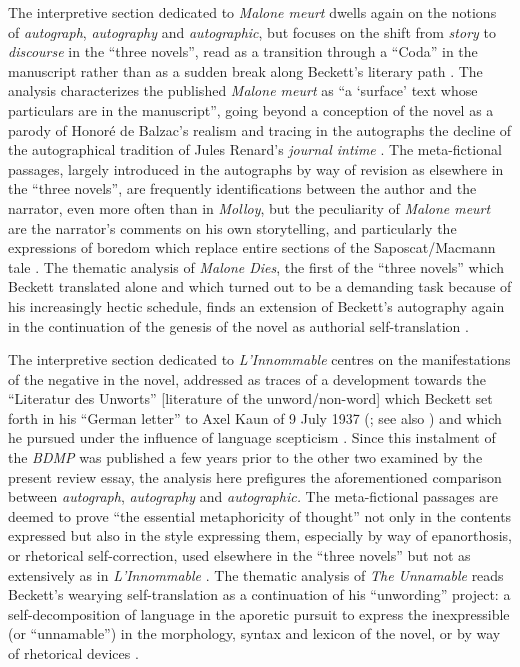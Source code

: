 \begin{paper}
The interpretive section dedicated to \emph{Malone meurt} dwells again
on the notions of \emph{autograph}, \emph{autography} and
\emph{autographic}, but focuses on the shift from \emph{story} to
\emph{discourse} in the ``three novels'', read as a transition through a
``Coda'' in the manuscript rather than as a sudden break along Beckett's
literary path \citep[23--24]{van_hulle_making_2017}. The analysis
characterizes the published \emph{Malone meurt} as ``a `surface' text
whose particulars are in the manuscript'', going beyond a conception of
the novel as a parody of Honoré de Balzac's realism and tracing in the
autographs the decline of the autographical tradition of Jules Renard's
\emph{journal intime} \citep[27--29 and 158]{van_hulle_making_2017}. The
meta-fictional passages, largely introduced in the autographs by way of
revision as elsewhere in the ``three novels'', are frequently
identifications between the author and the narrator, even more often than in
\emph{Molloy}, but the peculiarity of \emph{Malone meurt} are the
narrator's comments on his own storytelling, and particularly the
expressions of boredom which replace entire sections of the
Saposcat/Macmann tale \citep[123 and \emph{passim}]{van_hulle_making_2017}. The thematic analysis of \emph{Malone Dies}, the first
of the ``three novels'' which Beckett translated alone and which turned
out to be a demanding task because of his increasingly hectic schedule,
finds an extension of Beckett's autography again in the continuation of
the genesis of the novel as authorial self-translation \citep[275]{van_hulle_making_2017}.

The interpretive section dedicated to \emph{L'Innommable} centres on the
manifestations of the negative in the novel, addressed as traces of a
development towards the ``Literatur des Unworts'' {[}literature of the
unword/non-word{]} which Beckett set forth in his ``German letter'' to
Axel Kaun of 9 July 1937 (\citealt[4 and 173]{beckett_disjecta_1983}; see also \citealt[1: 515 and 520]{beckett_letters_2009}) and which he pursued under the influence of
language scepticism \citep[19 and 22]{van_hulle_making_2014}. Since this
instalment of the \emph{BDMP} was published a few years prior to the other
two examined by the present review essay, the analysis here prefigures
the aforementioned comparison between \emph{autograph},
\emph{autography} and \emph{autographic.} The meta-fictional passages
are deemed to prove ``the essential metaphoricity of thought'' not only
in the contents expressed but also in the style expressing them,
especially by way of epanorthosis, or rhetorical self-correction, used
elsewhere in the ``three novels'' but not as extensively as in
\emph{L'Innommable} \citep[26 and 103]{van_hulle_making_2014}. The
thematic analysis of \emph{The Unnamable} reads Beckett's wearying
self-translation as a continuation of his ``unwording'' project: a
self-decomposition of language in the aporetic pursuit to express the
inexpressible (or ``unnamable'') in the morphology, syntax and lexicon
of the novel, or by way of rhetorical devices \citep[194--95]{van_hulle_making_2014}.


\end{paper}
